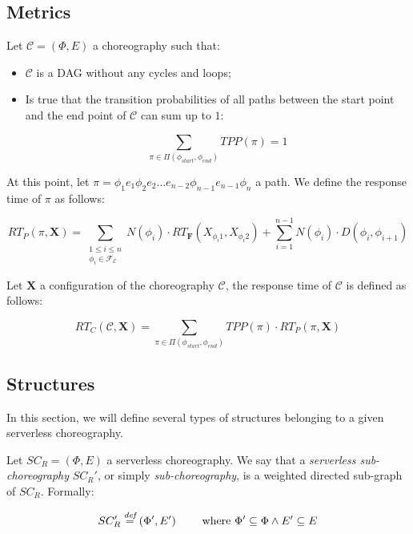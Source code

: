 \subsection{Metrics}

Let $\mathcal{C} = (\Phi,E)$ a choreography such that:
\begin{itemize}
	\item $\mathcal{C}$ is a DAG without any cycles and loops;
	\item Is true that the transition probabilities of all paths between the start point and
	the end point of $\mathcal{C}$ can sum up to $1$:
	
	\begin{equation}
		\sum_{\pi \in \Pi(\phi_{start}, \phi_{end})} TPP(\pi) = 1
	\end{equation}

\end{itemize}

At this point, let $\pi = \phi_1 e_1 \phi_2 e_2 \ldots e_{n-2}\phi_{n-1} e_{n-1} \phi_n$ a path. We define the response time of $\pi$ as follows:

\begin{equation}
	RT_P(\pi, \textbf{X}) = \sum_{\substack{1\le i\le n\\ \phi_i \in \mathscr{F_E}}} N(\phi_i) \cdot RT_{\textbf{F}} (X_{\phi_{i}1},X_{\phi_{i}2}) + \sum_{i = 1}^{n-1} N(\phi_i) \cdot D(\phi_i,\phi_{i+1})
\end{equation}

Let $\textbf{X}$ a configuration of the choreography $\mathcal{C}$, the response time of $\mathcal{C}$ is defined as follows:

\begin{equation}
	RT_C(\mathcal{C}, \textbf{X}) = \sum_{\pi \in \Pi(\phi_{start}, \phi_{end})} TPP(\pi) \cdot RT_{P}(\pi, \textbf{X})
\end{equation}

\subsection{Structures}

In this section, we will define several types of structures belonging to a given serverless choreography. 

Let $SC_R = (\Phi,E)$ a serverless choreography. We say that a \textit{serverless sub-choreography} $SC_R'$, or simply \textit{sub-choreography}, is a weighted directed sub-graph of $SC_R$. Formally:

\begin{equation}
	SC_R' \overset{\textit{def}}{=} (\Phi',E') \qquad \text{ where } \Phi' \subseteq \Phi \wedge E' \subseteq E
\end{equation}

